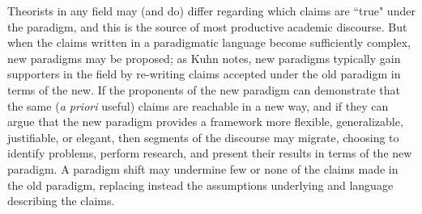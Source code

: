 Theorists in any field may (and do) differ regarding which claims are ``true" under the paradigm, and this is the source of most productive academic discourse.  But when the claims written in a paradigmatic language become sufficiently complex, new paradigms may be proposed; as Kuhn notes, new paradigms typically gain supporters in the field by re-writing claims accepted under the old paradigm in terms of the new.  If the proponents of the new paradigm can demonstrate that the same (\emph{a priori} useful) claims are reachable in a new way, and if they can argue that the new paradigm provides a framework more flexible, generalizable, justifiable, or elegant, then segments of the discourse may migrate, choosing to identify problems, perform research, and present their results in terms of the new paradigm.  A paradigm shift may undermine few or none of the claims made in the old paradigm, replacing instead the assumptions underlying and language describing the claims.

